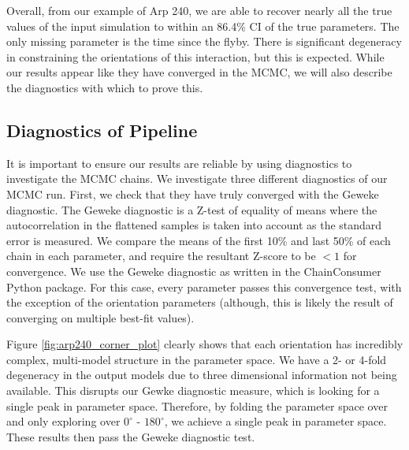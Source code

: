 Overall, from our example of Arp 240, we are able to recover nearly all the true values of the input simulation to within an 86.4\% CI of the true parameters. The only missing parameter is the time since the flyby. There is significant degeneracy in constraining the orientations of this interaction, but this is expected. While our results appear like they have converged in the MCMC, we will also describe the diagnostics with which to prove this. 

\subsection{Diagnostics of Pipeline}
\noindent It is important to ensure our results are reliable by using diagnostics to investigate the MCMC chains. We investigate three different diagnostics of our MCMC run. First, we check that they have truly converged with the Geweke diagnostic. The Geweke diagnostic is a Z-test of equality of means where the autocorrelation in the flattened samples is taken into account as the standard error is measured. We compare the means of the first 10\% and last 50\% of each chain in each parameter, and require the resultant Z-score to be $<1$ for convergence. We use the Geweke diagnostic as written in the ChainConsumer \citep{2016JOSS....1...45H} Python package. For this case, every parameter passes this convergence test, with the exception of the orientation parameters (although, this is likely the result of converging on multiple best-fit values).

Figure \ref{fig:arp240_corner_plot} clearly shows that each orientation has incredibly complex, multi-model structure in the parameter space. We have a 2- or 4-fold degeneracy in the output models due to three dimensional information not being available. This disrupts our Gewke diagnostic measure, which is looking for a single peak in parameter space. Therefore, by folding the parameter space over and only exploring over $0^{\circ}$ - $180^{\circ}$, we achieve a single peak in parameter space. These results then pass the Geweke diagnostic test.

